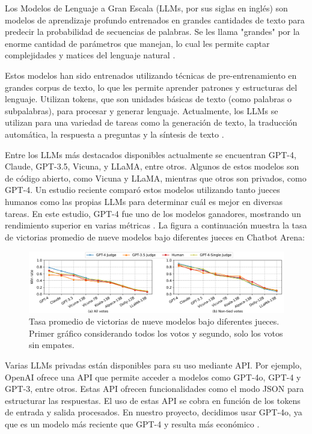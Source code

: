 Los Modelos de Lenguaje a Gran Escala (LLMs, por sus siglas en inglés) son modelos de aprendizaje profundo entrenados en grandes cantidades de texto para predecir la probabilidad de secuencias de palabras. Se les llama "grandes" por la enorme cantidad de parámetros que manejan, lo cual les permite captar complejidades y matices del lenguaje natural \cite{vaswani2017}.

Estos modelos han sido entrenados utilizando técnicas de pre-entrenamiento en grandes corpus de texto, lo que les permite aprender patrones y estructuras del lenguaje. Utilizan tokens, que son unidades básicas de texto (como palabras o subpalabras), para procesar y generar lenguaje. Actualmente, los LLMs se utilizan para una variedad de tareas como la generación de texto, la traducción automática, la respuesta a preguntas y la síntesis de texto \cite{vaswani2017}.

Entre los LLMs más destacados disponibles actualmente se encuentran GPT-4, Claude, GPT-3.5, Vicuna, y LLaMA, entre otros. Algunos de estos modelos son de código abierto, como Vicuna y LLaMA, mientras que otros son privados, como GPT-4. Un estudio reciente comparó estos modelos utilizando tanto jueces humanos como las propias LLMs para determinar cuál es mejor en diversas tareas. En este estudio, GPT-4 fue uno de los modelos ganadores, mostrando un rendimiento superior en varias métricas \cite{zheng2023judging}. La figura a continuación muestra la tasa de victorias promedio de nueve modelos bajo diferentes jueces en Chatbot Arena:

\begin{figure}[h]
  \centering
  \includegraphics[width=\linewidth]{./Figures/comparacion_LLMs.png}
  \caption{Tasa promedio de victorias de nueve modelos bajo diferentes jueces. Primer gráfico considerando todos los votos y segundo, solo los votos sin empates\cite{zheng2023judging}.}
\end{figure}

Varias LLMs privadas están disponibles para su uso mediante API. Por ejemplo, OpenAI ofrece una API que permite acceder a modelos como GPT-4o, GPT-4 y GPT-3, entre otros. Estas API ofrecen funcionalidades como el modo JSON para estructurar las respuestas. El uso de estas API se cobra en función de los tokens de entrada y salida procesados. En nuestro proyecto, decidimos usar GPT-4o, ya que es un modelo más reciente que GPT-4 y resulta más económico \cite{openai}.

